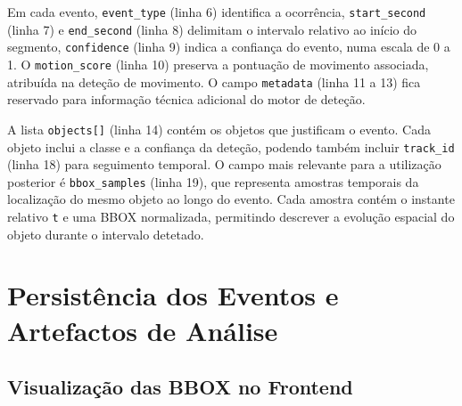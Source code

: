 Em cada evento, \texttt{event\_type} (linha 6) identifica a ocorrência, \texttt{start\_second} (linha 7) e \texttt{end\_second} (linha 8) delimitam o intervalo relativo ao início do segmento, \texttt{confidence} (linha 9) indica a confiança do evento, numa escala de 0 a 1. O \texttt{motion\_score} (linha 10) preserva a pontuação de movimento associada, atribuída na deteção de movimento. O campo \texttt{metadata} (linha 11 a 13) fica reservado para informação técnica adicional do motor de deteção.

A lista \texttt{objects[]} (linha 14) contém os objetos que justificam o evento. Cada objeto inclui a classe e a confiança da deteção, podendo também incluir \texttt{track\_id} (linha 18) para seguimento temporal. O campo mais relevante para a utilização posterior é \texttt{bbox\_samples} (linha 19), que representa amostras temporais da localização do mesmo objeto ao longo do evento. Cada amostra contém o instante relativo \texttt{t} e uma \gls{BBOX} normalizada, permitindo descrever a evolução espacial do objeto durante o intervalo detetado.

\section{Persistência dos Eventos e Artefactos de Análise}

\subsection{Visualização das BBOX no Frontend}


